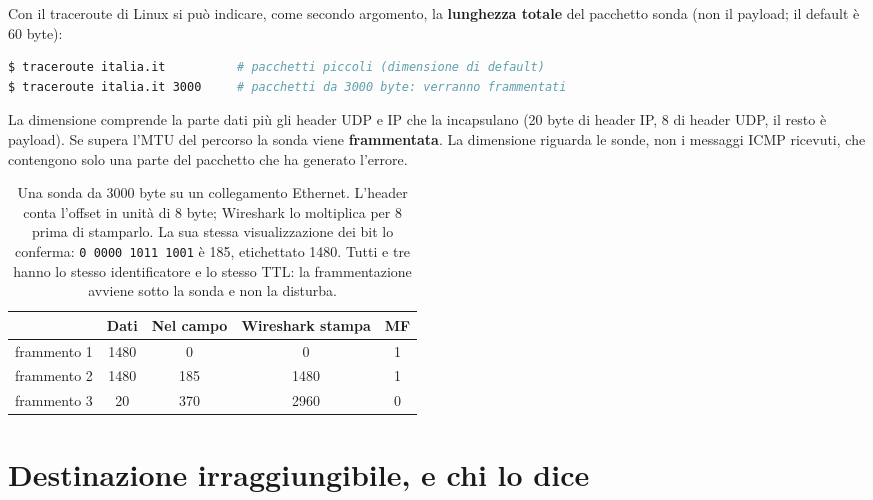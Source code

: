 Con il traceroute di Linux si può indicare, come secondo argomento, la \textbf{lunghezza totale} del pacchetto sonda (non
il payload; il default è 60 byte):

\begin{lstlisting}[language=bash]
$ traceroute italia.it          # pacchetti piccoli (dimensione di default)
$ traceroute italia.it 3000     # pacchetti da 3000 byte: verranno frammentati
\end{lstlisting}

La dimensione comprende la parte dati più gli header UDP e IP che la incapsulano (20 byte di header IP, 8 di header UDP,
il resto è payload). Se supera l'MTU del percorso la sonda viene \textbf{frammentata}. La dimensione riguarda le sonde, non i
messaggi ICMP ricevuti, che contengono solo una parte del pacchetto che ha generato l'errore.

\begin{table}[H]
\centering
\begin{tabular}{l c c c c}
\toprule
 & \textbf{Dati} & \textbf{Nel campo} & \textbf{Wireshark stampa} & \textbf{MF} \\
\midrule
frammento 1 & 1480 & 0   & 0    & 1 \\
frammento 2 & 1480 & 185 & 1480 & 1 \\
frammento 3 & 20   & 370 & 2960 & 0 \\
\bottomrule
\end{tabular}
\caption{Una sonda da 3000 byte su un collegamento Ethernet. L'header conta l'offset in unità di 8 byte; Wireshark lo
         moltiplica per 8 prima di stamparlo. La sua stessa visualizzazione dei bit lo conferma: \texttt{0 0000 1011 1001} è
         185, etichettato 1480. Tutti e tre hanno lo stesso identificatore e lo stesso TTL: la frammentazione avviene sotto la
         sonda e non la disturba.}
\end{table}

\section{Destinazione irraggiungibile, e chi lo dice}


